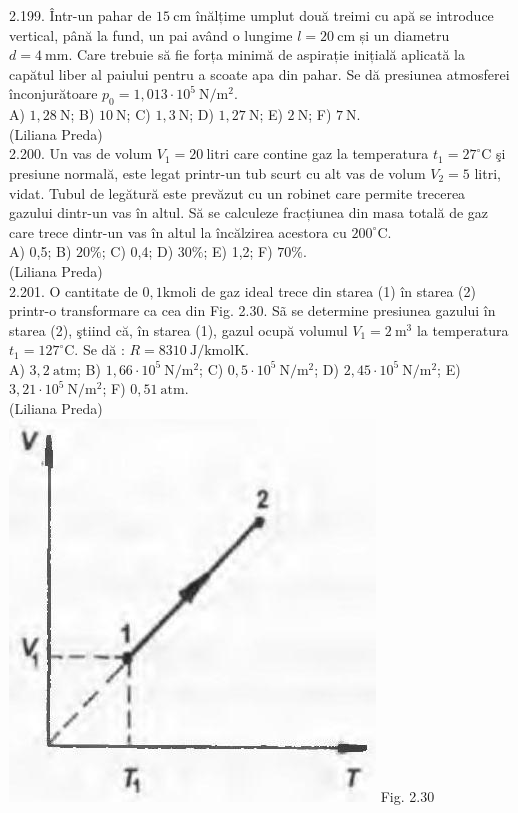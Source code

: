 2.199. Într-un pahar de $15 \mathrm{~cm}$ înălțime umplut două treimi cu apă se introduce vertical, până la fund, un pai având o lungime $l=20 \mathrm{~cm}$ și un diametru $d=4 \mathrm{~mm}$. Care trebuie să fie forța minimă de aspirație inițială aplicată la capătul liber al paiului pentru a scoate apa din pahar. Se dă presiunea atmosferei înconjurătoare $p_{0}=1,013 \cdot 10^{5} \mathrm{~N} / \mathrm{m}^{2}$.\\ A) $1,28 \mathrm{~N}$; B) $10 \mathrm{~N}$; C) $1,3 \mathrm{~N}$; D) $1,27 \mathrm{~N}$; E) $2 \mathrm{~N}$; F) $7 \mathrm{~N}$.\\ (Liliana Preda)\\

2.200. Un vas de volum $V_{1}=20 \mathrm{~litri}$ care contine gaz la temperatura $t_{1}=27^{\circ} \mathrm{C}$ şi presiune normală, este legat printr-un tub scurt cu alt vas de volum $V_{2}=5$ litri, vidat. Tubul de legătură este prevăzut cu un robinet care permite trecerea gazului dintr-un vas în altul. Să se calculeze fracțiunea din masa totală de gaz care trece dintr-un vas în altul la încălzirea acestora cu $200^{\circ} \mathrm{C}$.\\ A) 0,5; B) $20 \%$; C) 0,4; D) $30 \%$; E) 1,2; F) $70 \%$.\\ (Liliana Preda)\\

2.201. O cantitate de $0,1 \mathrm{kmoli}$ de gaz ideal trece din starea (1) în starea (2) printr-o transformare ca cea din Fig. 2.30. Sã se determine presiunea gazului în starea (2), ştiind că, în starea (1), gazul ocupă volumul $V_{1}=2 \mathrm{~m}^{3}$ la temperatura ${t}_{1}=127^{\circ} \mathrm{C}$. Se dă : $R=8310 \mathrm{~J} / \mathrm{kmolK}$.\\ A) $3,2 \mathrm{~atm}$; B) $1,66 \cdot 10^{5} \mathrm{~N} / \mathrm{m}^{2}$; C) $0,5 \cdot 10^{5} \mathrm{~N} / \mathrm{m}^{2}$; D) $2,45 \cdot 10^{5} \mathrm{~N} / \mathrm{m}^{2}$; E) $3,21 \cdot 10^{5} \mathrm{~N} / \mathrm{m}^{2}$; F) $0,51 \mathrm{~atm}$.\\ (Liliana Preda)\\ \includegraphics[width=0.4\linewidth]{images/2025_07_01_5b3ff9fa0d508c8e9f17g-119} Fig. 2.30\\

